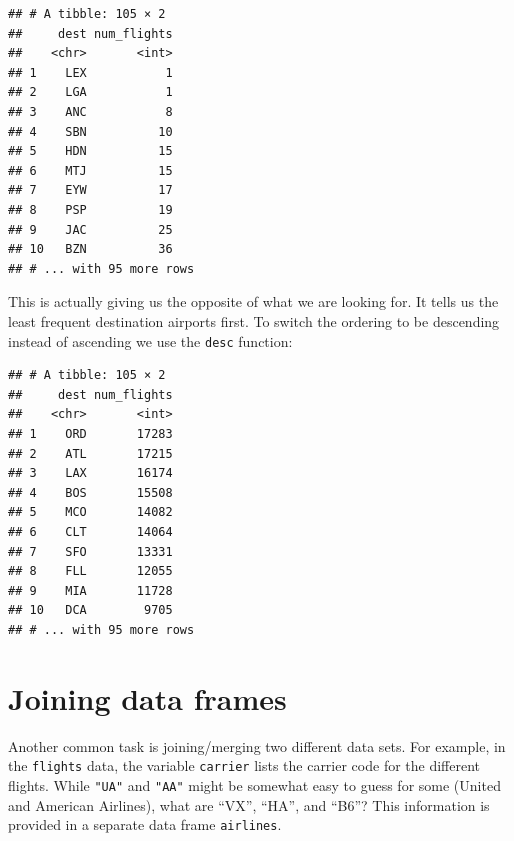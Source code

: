 \documentclass[]{tufte-book}
\newenvironment{Shaded}{\begin{snugshade}}{\end{snugshade}}
\newcommand{\KeywordTok}[1]{\textcolor[rgb]{0.13,0.29,0.53}{\textbf{{#1}}}}
\newcommand{\StringTok}[1]{\textcolor[rgb]{0.31,0.60,0.02}{{#1}}}
\newcommand{\NormalTok}[1]{{#1}}
\begin{document}
\begin{Shaded}
\end{Shaded}

\begin{verbatim}
## # A tibble: 105 × 2
##     dest num_flights
##    <chr>       <int>
## 1    LEX           1
## 2    LGA           1
## 3    ANC           8
## 4    SBN          10
## 5    HDN          15
## 6    MTJ          15
## 7    EYW          17
## 8    PSP          19
## 9    JAC          25
## 10   BZN          36
## # ... with 95 more rows
\end{verbatim}

This is actually giving us the opposite of what we are looking for. It
tells us the least frequent destination airports first. To switch the
ordering to be descending instead of ascending we use the \texttt{desc}
function:

\begin{Shaded}
\end{Shaded}

\begin{verbatim}
## # A tibble: 105 × 2
##     dest num_flights
##    <chr>       <int>
## 1    ORD       17283
## 2    ATL       17215
## 3    LAX       16174
## 4    BOS       15508
## 5    MCO       14082
## 6    CLT       14064
## 7    SFO       13331
## 8    FLL       12055
## 9    MIA       11728
## 10   DCA        9705
## # ... with 95 more rows
\end{verbatim}

\section{Joining data frames}\label{joining-data-frames}

Another common task is joining/merging two different data sets. For
example, in the \texttt{flights} data, the variable \texttt{carrier}
lists the carrier code for the different flights. While \texttt{"UA"}
and \texttt{"AA"} might be somewhat easy to guess for some (United and
American Airlines), what are ``VX'', ``HA'', and ``B6''? This
information is provided in a separate data frame \texttt{airlines}.
\end{document}
